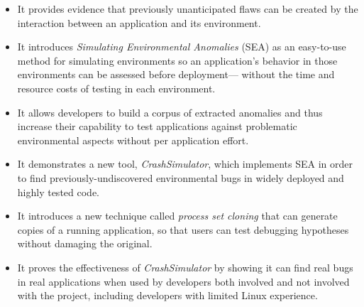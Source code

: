 \begin{itemize}

\item{It provides evidence
that previously unanticipated flaws can be created by the interaction
between an application and its environment.}

\item{It introduces \textit{Simulating Environmental Anomalies} (SEA)
as an easy-to-use method for simulating environments
so an application's behavior in those environments
can be assessed before deployment---
without the time and resource costs of
testing in each environment.}

\item{It allows developers to build a corpus of extracted anomalies and thus
increase their capability to test applications against
problematic environmental aspects without per application effort.}

\item{It demonstrates a new tool, {\em CrashSimulator},
which implements SEA
in order to find previously-undiscovered environmental bugs
in widely deployed and highly tested code.}

\item{It introduces a new technique called {\it process set cloning}
that can generate copies of a running application,
so that users can test debugging hypotheses without damaging the
original.}

\item{It proves the effectiveness
of {\em CrashSimulator}
by showing it can find real bugs in real applications
when used by developers both involved and not involved with the project,
including developers with limited Linux experience.}

\end{itemize}
